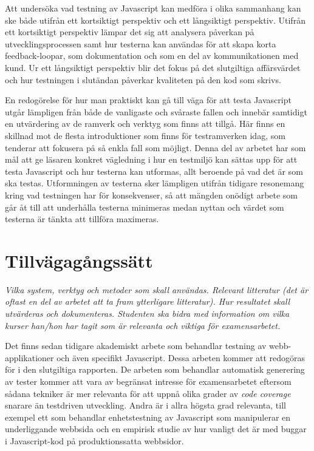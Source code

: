\documentclass[11pt]{article}
\begin{document}
Att undersöka vad testning av Javascript kan medföra i olika sammanhang kan ske både utifrån ett kortsiktigt perspektiv och ett långsiktigt perspektiv. Utifrån ett kortsiktigt perspektiv lämpar det sig att analysera påverkan på utvecklingsprocessen samt hur testerna kan användas för att skapa korta feedback-loopar, som dokumentation och som en del av kommunikationen med kund. Ur ett långsiktigt perspektiv blir det fokus på det slutgiltiga affärsvärdet och hur testningen i slutändan påverkar kvaliteten på den kod som skrivs.

En redogörelse för hur man praktiskt kan gå till väga för att testa Javascript utgår lämpligen från både de vanligaste och svåraste fallen och innebär samtidigt en utvärdering av de ramverk och verktyg som finns att tillgå. Här finns en skillnad mot de flesta introduktioner som finns för testramverken idag, som tenderar att fokusera på så enkla fall som möjligt. Denna del av arbetet har som mål att ge läsaren konkret vägledning i hur en testmiljö kan sättas upp för att testa Javascript och hur testerna kan utformas, allt beroende på vad det är som ska testas. Utformningen av testerna sker lämpligen utifrån tidigare resonemang kring vad testningen har för konsekvenser, så att mängden onödigt arbete som går åt till att underhålla testerna minimeras medan nyttan och värdet som testerna är tänkta att tillföra maximeras.

\section{Tillvägagångssätt}

\textit{Vilka system, verktyg och metoder som skall användas. Relevant litteratur (det är oftast en del av arbetet att ta fram ytterligare litteratur). Hur resultatet skall utvärderas och dokumenteras. Studenten ska bidra med information om vilka kurser han/hon har tagit som är relevanta och viktiga för examensarbetet.}

Det finns sedan tidigare akademiskt arbete som behandlar testning av webb-applikationer och även specifikt Javascript. Dessa arbeten kommer att redogöras för i den slutgiltiga rapporten. De arbeten som behandlar automatisk generering av tester\cite{AutomatedTesting} kommer att vara av begränsat intresse för examensarbetet eftersom sådana tekniker är mer relevanta för att uppnå olika grader av \textit{\foreignlanguage{english}{code coverage}} snarare än testdriven utveckling. Andra är i allra högsta grad relevanta, till exempel ett som behandlar enhetstestning av Javascript som manipulerar en underliggande webbsida\cite{DOMJavascript} och en empirisk studie av hur vanligt det är med buggar i Javascript-kod på produktionssatta webbsidor\cite{Wild}.
\end{document}
